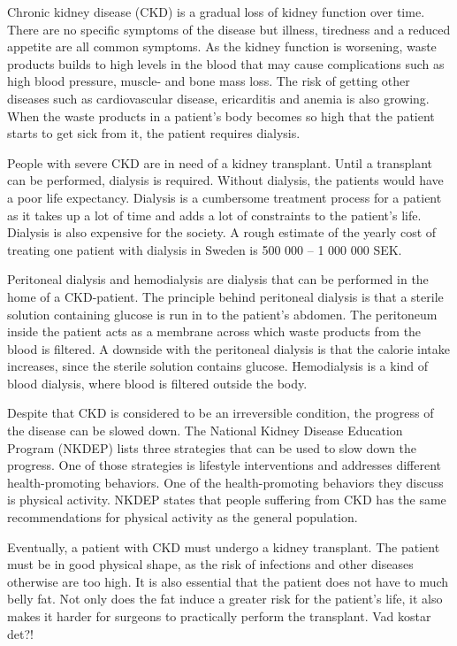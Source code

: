 \documentclass{cslthse-msc}
\begin{document}
Chronic kidney disease (CKD) is a gradual loss of kidney function over time\cite{KIDNEYFOUNDATION}. There are no specific symptoms of the disease but illness, tiredness and a reduced appetite are all common symptoms. As the kidney function is worsening, waste products builds to high levels in the blood that may cause complications such as high blood pressure,  muscle- and bone mass loss. The risk of getting other diseases such as cardiovascular disease, ericarditis and anemia is also growing.  When the waste products in a patient’s body becomes so high that the patient starts to get sick from it, the patient requires dialysis\cite{KIDNEYFOUNDATION}.

People with severe CKD are in need of a kidney transplant. Until a transplant can be performed, dialysis is required. Without dialysis, the patients would have a poor life expectancy\cite{KIDNEYFOUNDATION}. Dialysis is a cumbersome treatment process for a patient as it takes up a lot of time and adds a lot of constraints to the patient’s life. Dialysis is also expensive for the society. A rough estimate of the yearly cost of treating one patient with dialysis in Sweden is 500 000 – 1 000 000 SEK. 

Peritoneal dialysis and hemodialysis are dialysis that can be performed in the home of a CKD-patient. The principle behind peritoneal dialysis is that a sterile solution containing glucose is run in to the patient’s abdomen\cite{DIALYSIS}. The peritoneum inside the patient acts as a membrane across which waste products from the blood is filtered. A downside with the peritoneal dialysis is that the calorie intake increases, since the sterile solution contains glucose. Hemodialysis is a kind of blood dialysis, where blood is filtered outside the body.

Despite that CKD is considered to be an irreversible condition, the progress of the disease can be slowed down. The National Kidney Disease Education Program (NKDEP) lists three strategies that can be used to slow down the progress\cite{NKDEPPROG}. One of those strategies is lifestyle interventions and addresses different health-promoting behaviors. One of the health-promoting behaviors they discuss is physical activity. NKDEP states that people suffering from CKD has the same recommendations for physical activity as the general population. 

Eventually, a patient with CKD must undergo a kidney transplant. The patient must be in good physical shape, as the risk of infections and other diseases otherwise are too high. It is also essential that the patient does not have to much belly fat. Not only does the fat induce a greater risk for the patient's life, it also makes it harder for surgeons to practically perform the transplant. Vad kostar det?!
\end{document}
